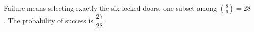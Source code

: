 Failure means selecting exactly the six locked doors, one subset among $\binom86=28$. The probability of success is $\boxed{\dfrac{27}{28}}$.
